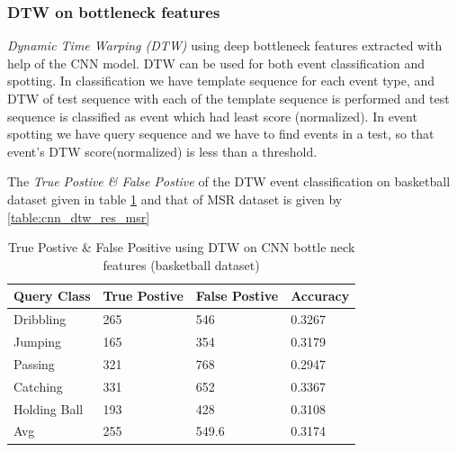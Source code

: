 \subsubsection{DTW on bottleneck features}
\textit{Dynamic Time Warping (DTW)} using deep bottleneck features extracted with help of the CNN model. DTW can be used for both event classification and spotting. In classification we have template sequence for each event type, and DTW of test sequence with each of the template sequence is performed and test sequence is classified as event which had least score (normalized). In event spotting we have query sequence and we have to find events in a test, so that event's DTW score(normalized) is less than a threshold.


The \textit{True Postive \& False Postive} of the DTW event classification on basketball dataset given in table \ref{table:cnn_dtw_res_basket} and that of MSR dataset is given by \ref{table:cnn_dtw_res_msr}

\begin{table}[h]
\centering
\begin{tabular}{|l|l|l|l|}
\hline
Query Class & True Postive & False Postive & Accuracy \\ \hline
Dribbling   &265  &546   &0.3267\\
Jumping     &165  &354   &0.3179\\
Passing     &321  &768   &0.2947\\
Catching    &331  &652   &0.3367\\
Holding Ball &193  &428   &0.3108\\
\hline
Avg         &255  &549.6 &0.3174\\
\hline  
\end{tabular}
\caption[Event classification using DTW on CNN bottleneck features (OSUPEL basketball dataset) ]{True Postive \& False Positive using DTW on CNN bottle neck features (basketball dataset)}
\label{table:cnn_dtw_res_basket}
\end{table} 

